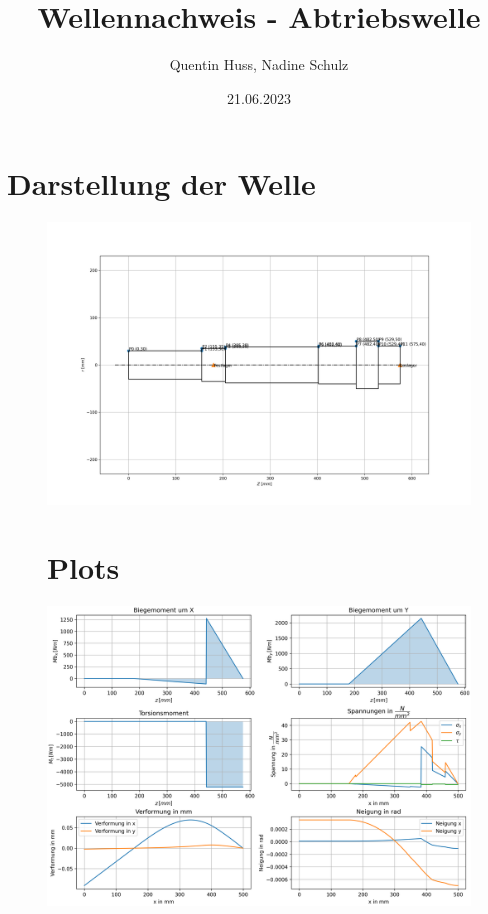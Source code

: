 \documentclass[11pt,a4paper]{article}
\title{Wellennachweis - Abtriebswelle}
\author{Quentin Huss, Nadine Schulz}
\date{21.06.2023}
\begin{document}
\maketitle

\section{Darstellung der Welle}
\begin{figure}[!h]
\centering
\includegraphics[scale=0.5]{AbtriebswelleWELLE.png}
\end{figure}

\pagebreak

\begin{figure}[!ht]
\section{Plots}
\centering
\includegraphics[scale=0.5]{Abtriebswelleplot.png}
\end{figure}
\end{document}
